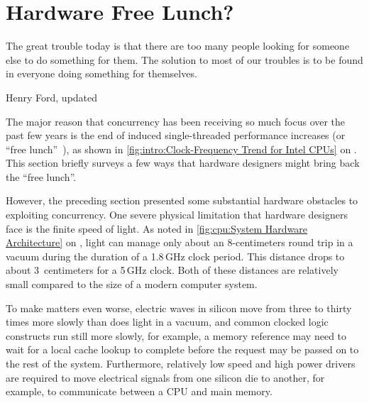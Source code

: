 
\section{Hardware Free Lunch?}
\label{sec:cpu:Hardware Free Lunch?}
%
\epigraph{The great trouble today is that there are too many people looking
	  for someone else to do something for them.
	  The solution to most of our troubles is to be found in everyone
	  doing something for themselves.}
	 {Henry Ford, updated}

The major reason that concurrency has been receiving so much focus over
the past few years is the end of 
induced single-threaded
performance increases
(or ``free lunch''~\cite{HerbSutter2008EffectiveConcurrency}),
as shown in
\cref{fig:intro:Clock-Frequency Trend for Intel CPUs} on
.
This section briefly surveys a few ways that hardware designers
might bring back the ``free lunch''.

However, the preceding section presented some substantial hardware
obstacles to exploiting concurrency.
One severe physical limitation that hardware designers face is the
finite speed of light.
As noted in
\cref{fig:cpu:System Hardware Architecture} on
,
light can manage only about an 8-centimeters round trip in a vacuum
during the duration of a 1.8\,GHz clock period.
This distance drops to about 3~centimeters for a 5\,GHz clock.
Both of these distances are relatively small compared to the size
of a modern computer system.

To make matters even worse, electric waves in silicon move from three to
thirty times more slowly than does light in a vacuum, and common
clocked logic constructs run still more slowly, for example, a
memory reference may need to wait for a local cache lookup to complete
before the request may be passed on to the rest of the system.
Furthermore, relatively low speed and high power drivers are required
to move electrical signals from one silicon die to another, for example,
to communicate between a CPU and main memory.

